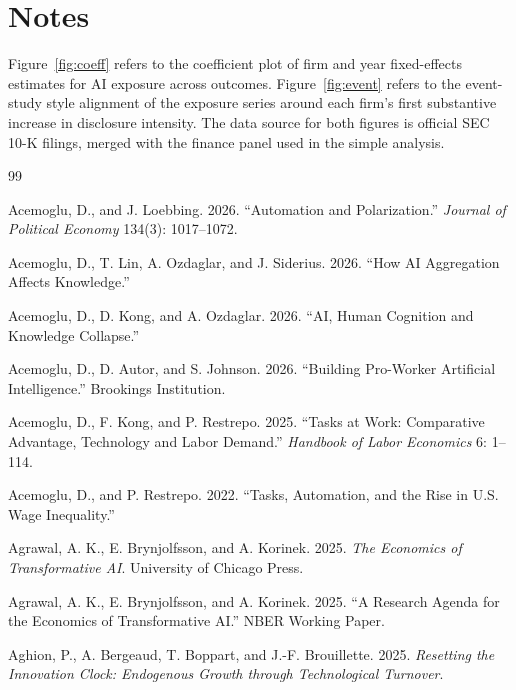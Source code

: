 \documentclass[11pt]{article}
\begin{document}
\section{Notes}
Figure~\ref{fig:coeff} refers to the coefficient plot of firm and year fixed-effects estimates for AI exposure across outcomes. Figure~\ref{fig:event} refers to the event-study style alignment of the exposure series around each firm's first substantive increase in disclosure intensity. The data source for both figures is official SEC 10-K filings, merged with the finance panel used in the simple analysis.

\begin{thebibliography}{99}

Acemoglu, D., and J. Loebbing. 2026.
\newblock ``Automation and Polarization.''
\newblock \emph{Journal of Political Economy} 134(3): 1017--1072.

Acemoglu, D., T. Lin, A. Ozdaglar, and J. Siderius. 2026.
\newblock ``How AI Aggregation Affects Knowledge.''

Acemoglu, D., D. Kong, and A. Ozdaglar. 2026.
\newblock ``AI, Human Cognition and Knowledge Collapse.''

Acemoglu, D., D. Autor, and S. Johnson. 2026.
\newblock ``Building Pro-Worker Artificial Intelligence.''
\newblock Brookings Institution.

Acemoglu, D., F. Kong, and P. Restrepo. 2025.
\newblock ``Tasks at Work: Comparative Advantage, Technology and Labor Demand.''
\newblock \emph{Handbook of Labor Economics} 6: 1--114.

Acemoglu, D., and P. Restrepo. 2022.
\newblock ``Tasks, Automation, and the Rise in U.S. Wage Inequality.''

Agrawal, A. K., E. Brynjolfsson, and A. Korinek. 2025.
\newblock \emph{The Economics of Transformative AI}.
\newblock University of Chicago Press.

Agrawal, A. K., E. Brynjolfsson, and A. Korinek. 2025.
\newblock ``A Research Agenda for the Economics of Transformative AI.''
\newblock NBER Working Paper.

Aghion, P., A. Bergeaud, T. Boppart, and J.-F. Brouillette. 2025.
\newblock \emph{Resetting the Innovation Clock: Endogenous Growth through Technological Turnover}.


\end{thebibliography}
\end{document}
